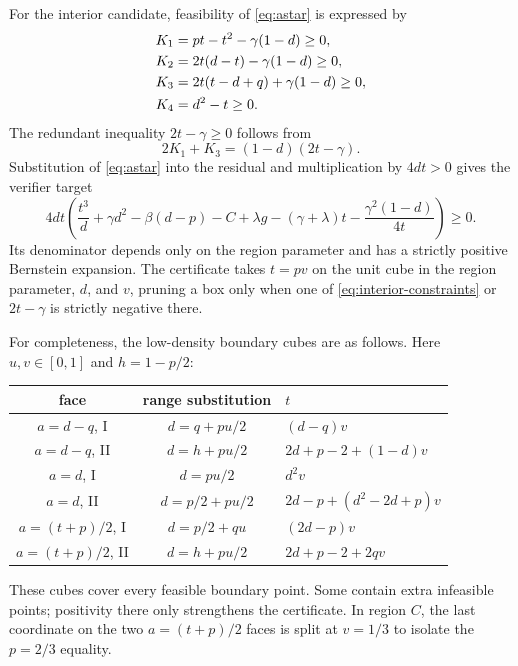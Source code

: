 \documentclass[11pt]{article}
\begin{document}
For the interior candidate, feasibility of \eqref{eq:astar} is expressed by
\begin{align}
 K_1&=pt-t^2-\gamma(1-d)\ge0,\notag\\
 K_2&=2t(d-t)-\gamma(1-d)\ge0,\notag\\
 K_3&=2t(t-d+q)+\gamma(1-d)\ge0,\label{eq:interior-constraints}\\
 K_4&=d^2-t\ge0.
\end{align}
The redundant inequality $2t-\gamma\ge0$ follows from
\[
 2K_1+K_3=(1-d)(2t-\gamma).
\]
Substitution of \eqref{eq:astar} into the residual and multiplication by
$4dt>0$ gives the verifier target
\begin{equation}
 4dt\left(
 \frac{t^3}{d}+\gamma d^2-\beta(d-p)-C+\lambda g
 -(\gamma+\lambda)t-\frac{\gamma^2(1-d)}{4t}
 \right)\ge0.
 \label{eq:interior-polynomial}
\end{equation}
Its denominator depends only on the region parameter and has a strictly
positive Bernstein expansion.  The certificate takes $t=pv$ on the unit
cube in the region parameter, $d$, and $v$, pruning a box only when one of
\eqref{eq:interior-constraints} or $2t-\gamma$ is strictly negative there.

For completeness, the low-density boundary cubes are as follows.  Here
$u,v\in[0,1]$ and $h=1-p/2$:
\begin{center}
\begin{tabular}{ccl}
\toprule
face&range substitution&$t$\\
\midrule
$a=d-q$, I&$d=q+pu/2$&$(d-q)v$\\
$a=d-q$, II&$d=h+pu/2$&$2d+p-2+(1-d)v$\\
$a=d$, I&$d=pu/2$&$d^2v$\\
$a=d$, II&$d=p/2+pu/2$&$2d-p+(d^2-2d+p)v$\\
$a=(t+p)/2$, I&$d=p/2+qu$&$(2d-p)v$\\
$a=(t+p)/2$, II&$d=h+pu/2$&$2d+p-2+2qv$\\
\bottomrule
\end{tabular}
\end{center}
These cubes cover every feasible boundary point.  Some contain extra
infeasible points; positivity there only strengthens the certificate.  In
region $C$, the last coordinate on the two $a=(t+p)/2$ faces is split at
$v=1/3$ to isolate the $p=2/3$ equality.
\end{document}
